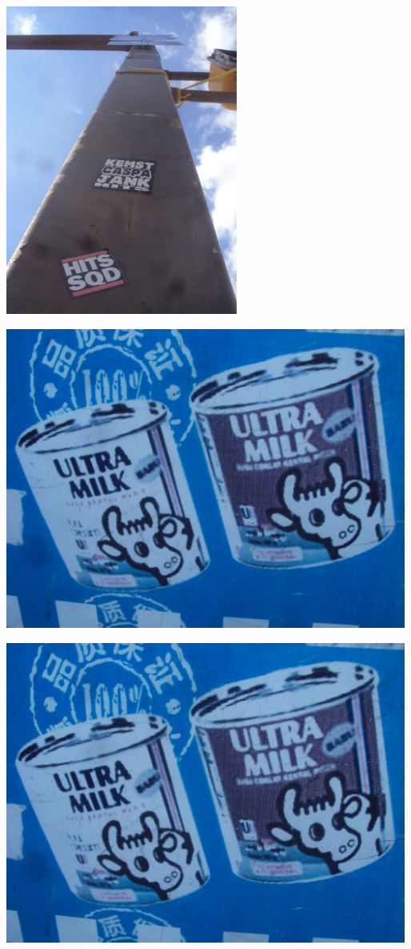\documentclass[10pt,letterpaper]{article}
\begin{document}
\pagebreak

\includegraphics[height=4in]{portrait.jpg}

\vspace{0.25in}
\includegraphics[width=5.19in]{landscape.jpg}
\pagebreak

\includegraphics[width=5.19in]{landscape.jpg}
\end{document}

